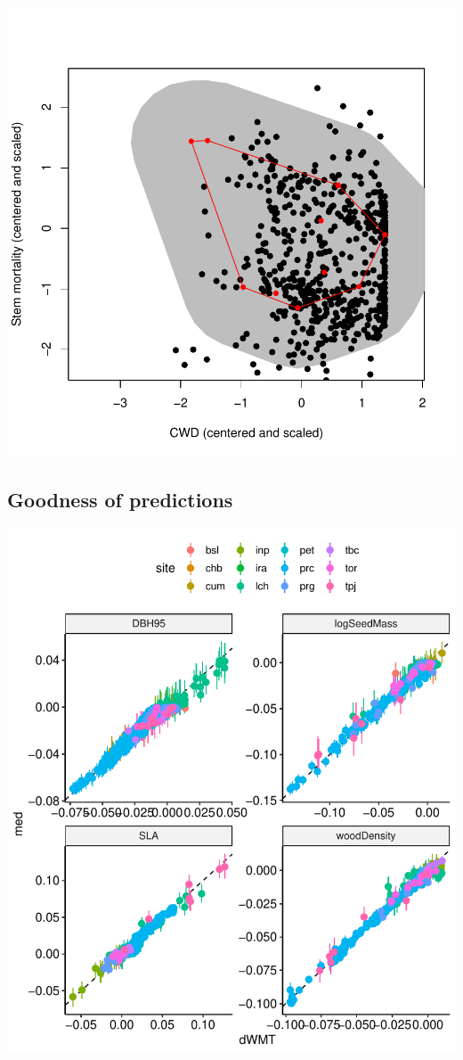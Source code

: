 \documentclass[]{elsarticle} %
\makeatletter
\def\maxwidth{\ifdim\Gin@nat@width>\linewidth\linewidth
\else\Gin@nat@width\fi}
\let\Oldincludegraphics\includegraphics
\renewcommand{\includegraphics}[1]{\Oldincludegraphics[width=\maxwidth]{#1}}
\makeatother
\begin{document}
\includegraphics{rticle_tmfo_functional_files/figure-latex/pixel_choice-1.pdf}

\subsection{Goodness of predictions}\label{goodness-of-predictions}

\includegraphics{rticle_tmfo_functional_files/figure-latex/gof-1.pdf}
\end{document}
